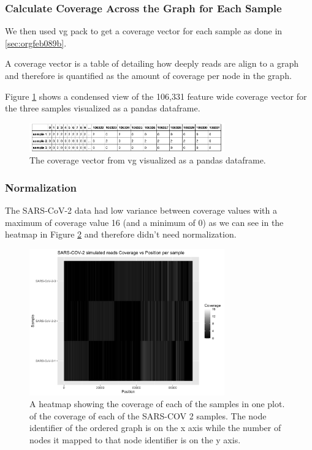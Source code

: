 \documentclass[10pt, a4paper]{article}
\begin{document}
\subsubsection{Calculate Coverage Across the Graph for Each Sample}
\label{sec:org31f1f58}
We then used vg pack to get a coverage vector for each sample as done in 
\ref{sec:orgfeb089b}.

A coverage vector is a table of detailing how deeply reads are align to a 
graph and therefore is quantified as the amount of coverage per node in the graph.

Figure \ref{fig:org115ee46} shows a condensed view of the 106,331 feature
wide coverage vector for the three samples visualized as a pandas dataframe.

\begin{figure}[h]
\centering
\includegraphics[width=0.75\textwidth]{../Figures/SARS_CoV_2/SARS_Coverage_Vector.png}
\caption[SARS-CoV-2 Coverage Vector]{\label{fig:org115ee46}
The coverage vector from vg visualized as a pandas dataframe.}
\end{figure}

\subsubsection{Normalization}
\label{sec:orgda9ee55}
The SARS-CoV-2 data had low variance between coverage values with a maximum of 
coverage value 16 (and a minimum of 0) as we can see in the heatmap in Figure
\ref{fig:org96de0f4} and therefore didn’t need normalization.

\begin{figure}[h!]
\centering
\includegraphics[width=0.75\textwidth]{../Figures/SARS_CoV_2/Heatmap.png}
\caption[SARS-CoV-2 heatmap]{\label{fig:org96de0f4}
A heatmap showing the coverage of each of the samples in one plot. of the coverage of each of the SARS-COV 2 samples. The node identifier of the ordered graph is on the x axis while the number of nodes it mapped to that node identifier is on the y axis.}
\end{figure}
\end{document}
